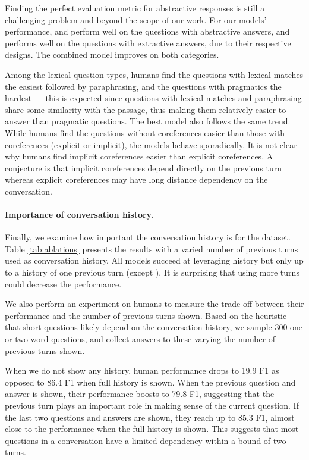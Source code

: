 Finding the perfect evaluation metric for abstractive responses is still a challenging problem \cite{liu2016not} and beyond the scope of our work.
For our models' performance,  and  perform well on the questions with abstractive answers, and  performs well on the questions with extractive answers, due to their respective designs.
The combined model improves on both categories.

Among the lexical question types, humans find the questions with lexical matches the easiest followed by paraphrasing, and the questions with pragmatics the hardest --- this is expected since questions with lexical matches and paraphrasing share some similarity with the passage, thus making them relatively easier to answer than pragmatic questions.
The best model also follows the same trend.
While humans find the questions without coreferences easier than those with coreferences (explicit or implicit), the models behave sporadically.
It is not clear why humans find implicit coreferences easier than explicit coreferences.
A conjecture is that implicit coreferences depend directly on the previous turn whereas explicit coreferences may have long distance dependency on the conversation.

\paragraph{Importance of conversation history.}
Finally, we examine how important the conversation history is for the dataset. Table \ref{tab:ablations} presents the results with a varied number of previous turns used as conversation history.
All models succeed at leveraging history but only up to a history of one previous turn (except ). It is surprising that using more turns could decrease the performance.

We also perform an experiment on humans to measure the trade-off between their performance and the number of previous turns shown.
Based on the heuristic that short questions likely depend on the conversation history, we sample 300 one or two word questions, and collect answers to these varying the number of previous turns shown.

When we do not show any history, human performance drops to 19.9 F1 as opposed to 86.4 F1 when full history is shown. When the previous question and answer is shown, their performance boosts to 79.8 F1, suggesting that the previous turn plays an important role in making sense of the current question. If the last two questions and answers are shown, they reach up to 85.3 F1, almost close to the performance when the full history is shown. This suggests that most questions in a conversation have a limited dependency within a bound of two turns.

